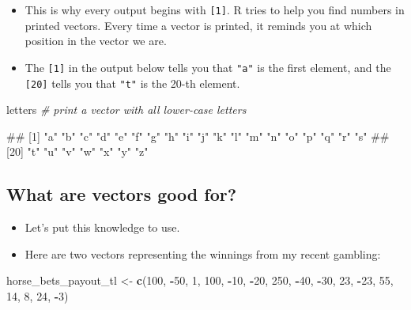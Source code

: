 \documentclass[
]{book}
\newenvironment{Shaded}{\begin{snugshade}}{\end{snugshade}}
\newcommand{\CommentTok}[1]{\textcolor[rgb]{0.56,0.35,0.01}{\textit{#1}}}
\newcommand{\DecValTok}[1]{\textcolor[rgb]{0.00,0.00,0.81}{#1}}
\newcommand{\FunctionTok}[1]{\textcolor[rgb]{0.13,0.29,0.53}{\textbf{#1}}}
\newcommand{\NormalTok}[1]{#1}
\newcommand{\OtherTok}[1]{\textcolor[rgb]{0.56,0.35,0.01}{#1}}
\newcommand{\SpecialCharTok}[1]{\textcolor[rgb]{0.81,0.36,0.00}{\textbf{#1}}}
\providecommand{\tightlist}{%
  \setlength{\itemsep}{0pt}\setlength{\parskip}{0pt}}
\begin{document}
\begin{itemize}
\tightlist
\item
  This is why every output begins with \texttt{{[}1{]}}. R tries to help you find numbers in printed vectors. Every time a vector is printed, it reminds you at which position in the vector we are.
\item
  The \texttt{{[}1{]}} in the output below tells you that \texttt{"a"} is the first element, and the \texttt{{[}20{]}} tells you that \texttt{"t"} is the 20-th element.
\end{itemize}

\begin{Shaded}
\begin{Highlighting}[]
\NormalTok{letters }\CommentTok{\# print a vector with all lower{-}case letters}
\end{Highlighting}
\end{Shaded}

\begin{Shaded}
\begin{Highlighting}[]
\NormalTok{\#\#  [1] "a" "b" "c" "d" "e" "f" "g" "h" "i" "j" "k" "l" "m" "n" "o" "p" "q" "r" "s"}
\NormalTok{\#\# [20] "t" "u" "v" "w" "x" "y" "z"}
\end{Highlighting}
\end{Shaded}

\subsection{What are vectors good for?}\label{what-are-vectors-good-for}

\begin{itemize}
\tightlist
\item
  Let's put this knowledge to use.
\item
  Here are two vectors representing the winnings from my recent gambling:
\end{itemize}

\begin{Shaded}
\begin{Highlighting}[]
\NormalTok{horse\_bets\_payout\_tl }\OtherTok{\textless{}{-}} \FunctionTok{c}\NormalTok{(}\DecValTok{100}\NormalTok{, }\SpecialCharTok{{-}}\DecValTok{50}\NormalTok{, }\DecValTok{1}\NormalTok{, }\DecValTok{100}\NormalTok{, }\SpecialCharTok{{-}}\DecValTok{10}\NormalTok{, }\SpecialCharTok{{-}}\DecValTok{20}\NormalTok{, }\DecValTok{250}\NormalTok{, }\SpecialCharTok{{-}}\DecValTok{40}\NormalTok{, }\SpecialCharTok{{-}}\DecValTok{30}\NormalTok{, }\DecValTok{23}\NormalTok{, }\SpecialCharTok{{-}}\DecValTok{23}\NormalTok{, }\DecValTok{55}\NormalTok{, }\DecValTok{14}\NormalTok{, }\DecValTok{8}\NormalTok{, }\DecValTok{24}\NormalTok{, }\SpecialCharTok{{-}}\DecValTok{3}\NormalTok{)}
\end{Highlighting}
\end{Shaded}
\end{document}
